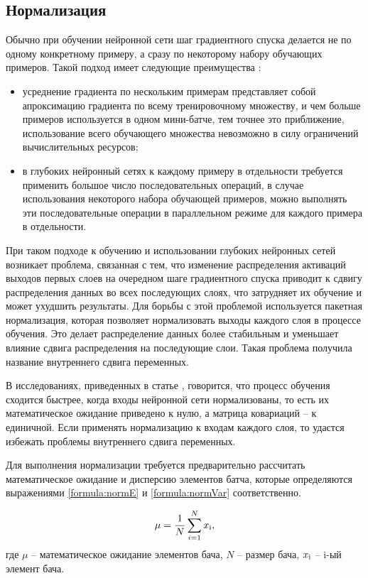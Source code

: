 \subsection{Нормализация}\label{sec:normalisation}
Обычно при обучении нейронной сети шаг градиентного спуска делается не по одному конкретному примеру, а сразу по некоторому набору обучающих примеров. Такой подход имеет следующие преимущества \cite{regulisation}:
\begin{itemize}
	\item усреднение градиента по нескольким примерам представляет собой апроксимацию градиента по всему тренировочному множеству, и чем больше примеров используется в одном мини-батче, тем точнее это приближение, использование всего обучающего множества невозможно в силу ограничений вычислительных ресурсов;
	\item в глубоких нейронный сетях к каждому примеру в отдельности требуется применить большое число последовательных операций, в случае использования некоторого набора обучающей примеров, можно выполнять эти последовательные операции в параллельном режиме для каждого примера в отдельности.
\end{itemize}

При таком подходе к обучению и использовании глубоких нейронных сетей возникает проблема, связанная с тем, что изменение распределения активаций выходов первых слоев на очередном шаге градиентного спуска приводит к сдвигу распределения данных во всех последующих слоях, что затрудняет их обучение и может ухудшить результаты. Для борьбы с этой проблемой используется пакетная нормализация, которая позволяет нормализовать выходы каждого слоя в процессе обучения. Это делает распределение данных более стабильным и уменьшает влияние сдвига распределения на последующие слои. Такая проблема получила название внутреннего сдвига переменных.

В исследованиях, приведенных в статье \cite{normalisation_lecun}, говорится, что процесс обучения сходится быстрее, когда входы нейронной сети нормализованы, то есть их математическое ожидание приведено к нулю, а матрица ковариаций -- к единичной. Если применять нормализацию к входам каждого слоя, то удастся избежать проблемы внутреннего сдвига переменных.

Для выполнения нормализации требуется предварительно рассчитать математическое ожидание и дисперсию элементов батча, которые определяются выражениями \ref{formula:normE} и \ref{formula:normVar} соответственно.

\begin{equation}\label{formula:normE}
\mu = \frac{1}{N} \sum\limits_{i=1}^{N}x_{\rm{i}},
\end{equation}
где $\mu$ -- математическое ожидание элементов бача, $N$ -- размер бача, $x_{\rm{i}}$ -- i-ый элемент бача.

